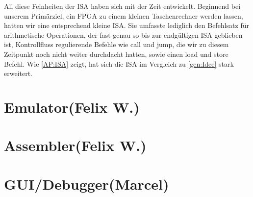 All diese Feinheiten der ISA haben sich mit der Zeit entwickelt. Beginnend bei unserem Primärziel, ein FPGA zu einem kleinen Taschenrechner werden lassen, hatten wir eine entsprechend kleine ISA. Sie umfasste lediglich den Befehlsatz für arithmetische Operationen, der fast genau so bis zur endgültigen ISA geblieben ist, Kontrollfluss regulierende Befehle wie call und jump, die wir zu diesem Zeitpunkt noch nicht weiter durchdacht hatten, sowie einen load und store Befehl. Wie \autoref{AP:ISA} zeigt, hat sich die ISA im Vergleich zu \autoref{gen:Idee} stark erweitert.

\section{Emulator(Felix W.)}
\section{Assembler(Felix W.)}
\section{GUI/Debugger(Marcel)}

